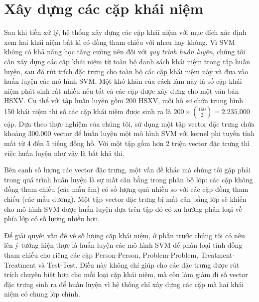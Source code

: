 \section{Xây dựng các cặp khái niệm}
Sau khi tiền xử lý, hệ thống xây dựng các cặp khái niệm với mục đích xác định xem hai khái niệm bất kì có đồng tham chiếu với nhau hay không. Vì SVM không có khả năng học tăng cường nên đối với \emph{quy trình huấn luyện}, chúng tôi cần xây dựng các cặp khái niệm từ toàn bộ danh sách khái niệm trong tập huấn luyện, sau đó rút trích đặc trưng cho toàn bộ các cặp khái niệm này và đưa vào huấn luyện các mô hình SVM. Một khó khăn của cách làm này là số cặp khái niệm phát sinh rất nhiều nếu tất cả các cặp được xây dựng cho một văn bản HSXV. Cụ thể với tập huấn luyện gồm 200 HSXV, mỗi hồ sơ chứa trung bình 150 khái niệm thì số các cặp khái niệm được sinh ra là $200\times \binom{150}{2}=2.235.000$ cặp. Dựa theo thực nghiệm của chúng tôi, sử dụng một tập vector đặc trưng chứa khoảng 300.000 vector để huấn luyện một mô hình SVM với kernel phi tuyến tính mất từ 4 đến 5 tiếng đồng hồ. Với một tập gồm hơn 2 triệu vector đặc trưng thì việc huấn luyện như vậy là bất khả thi.

Bên cạnh số lượng các vector đặc trưng, một vấn đề khác mà chúng tôi gặp phải trong quá trình huấn luyện là sự mất cân bằng trong phân bố lớp: các cặp không đồng tham chiếu (các mẫu âm) có số lượng quá nhiều so với các cặp đồng tham chiếu (các mẫu dương). Một tập vector đặc trưng bị mất cân bằng lớp sẽ khiến cho mô hình SVM được huấn luyện dựa trên tập đó có xu hướng phân loại về phía lớp có số lượng nhiều hơn. 

Để giải quyết vấn đề về số lượng cặp khái niệm, ở phần trước chúng tôi có nêu lên ý tưởng hiện thực là huấn luyện các mô hình SVM để phân loại tính đồng tham chiếu cho riêng các cặp Person-Person, Problem-Problem, Treatment-Treatment và Test-Test. Điều này không chỉ giúp cho các đặc trưng được rút trích chuyên biệt hơn cho mỗi loại cặp khái niệm, mà còn làm giảm đi số vector đặc trưng sinh ra để huấn luyện vì hệ thống chỉ xây dựng các cặp mà hai khái niệm có chung lớp chính.

